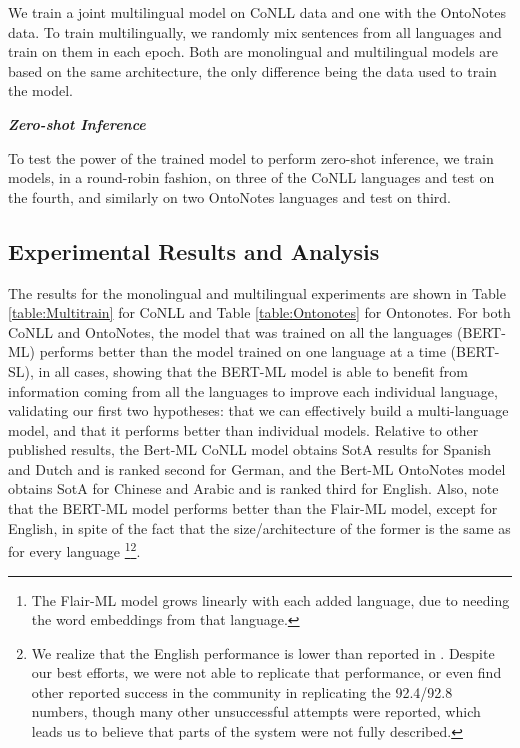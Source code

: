 \documentclass[letterpaper]{article} \usepackage{aaai20}  \usepackage{times}  \usepackage{helvet} \usepackage{courier}  \usepackage[hyphens]{url}  \usepackage{graphicx} \urlstyle{rm} \def\UrlFont{\rm}  \usepackage{graphicx}  \frenchspacing  \setlength{\pdfpagewidth}{8.5in}  \setlength{\pdfpageheight}{11in}  \usepackage{amsmath}
\begin{document}
We train a joint multilingual model on CoNLL data
and one with the OntoNotes data. To train multilingually, we randomly
mix sentences from all languages and train on them in each epoch.
Both are monolingual and multilingual models are based on the same
architecture, the only difference being the data used to train the
model.



\vspace*{1mm}\noindent\textbf{\textit{Zero-shot Inference}}

To test the power of the trained model to perform zero-shot inference,
we train models, in a round-robin fashion, on three of the CoNLL
languages and test on the fourth, and similarly on two OntoNotes
languages and test on third. 


\subsection{Experimental Results and Analysis}

The results for the monolingual and multilingual experiments are shown
in Table \ref{table:Multitrain} for CoNLL and Table \ref{table:Ontonotes} for Ontonotes. For both CoNLL and OntoNotes, the
model that was trained on all the languages (BERT-ML) performs better
than the model trained on one language at a time (BERT-SL), in all
cases, showing that the BERT-ML model is able to benefit from
information coming from all the languages to improve each individual
language, validating our first two hypotheses: that we can
effectively build a multi-language model, and that it performs better
than individual models. Relative to other published results, the
Bert-ML CoNLL model obtains SotA results for Spanish and Dutch and is
ranked second for German, and the Bert-ML OntoNotes model obtains SotA
for Chinese and Arabic and is ranked third for English. Also, note
that the BERT-ML model performs better than the Flair-ML model, except
for English, in spite of the fact that the size/architecture of the
former is the same as for every language \footnote{The Flair-ML model
  grows linearly with each added language, due to needing the word
  embeddings from that language.}\footnote{We realize that the English
  performance is lower than reported in \cite{BERT18}. Despite our
  best efforts, we were not able to replicate that performance, or
  even find other reported success in the community in replicating the
  92.4/92.8 numbers, though many other unsuccessful attempts were
  reported, which leads us to believe that parts of the system were
  not fully described.}.
\end{document}
